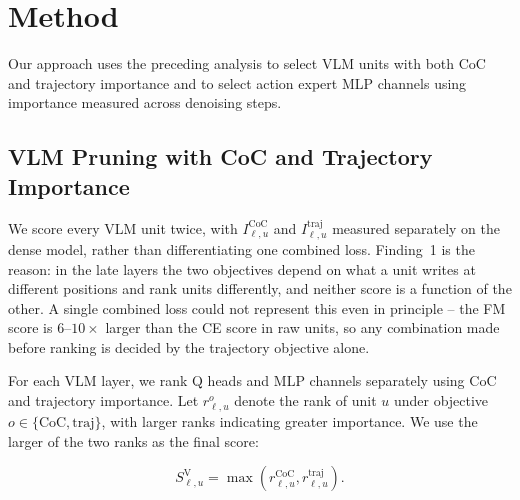 \section{Method}
\label{sec:structured_pruning}


Our approach uses the preceding analysis to select VLM units with both CoC and trajectory importance and to select action expert MLP channels using importance measured across denoising steps.

\subsection{VLM Pruning with CoC and Trajectory Importance}
\label{sec:vlm_pruning}

We score every VLM unit twice, with $I^{\mathrm{CoC}}_{\ell,u}$ and $I^{\mathrm{traj}}_{\ell,u}$ measured separately on the dense model, rather than differentiating one combined loss. Finding~1 is the reason: in the late layers the two objectives depend on what a unit writes at different positions and rank units differently, and neither score is a function of the other. A single combined loss could not represent this even in principle -- the FM score is $6$--$10\times$ larger than the CE score in raw units, so any combination made before ranking is decided by the trajectory objective alone.

For each VLM layer, we rank Q heads and MLP channels separately using CoC and trajectory importance. Let $r^o_{\ell,u}$ denote the rank of unit $u$ under objective $o\in\{\mathrm{CoC},\mathrm{traj}\}$, with larger ranks indicating greater importance. We use the larger of the two ranks as the final score:

\begin{equation}
    S^{\mathrm V}_{\ell,u}
      =\max\!\left(r^{\mathrm{CoC}}_{\ell,u},
                   r^{\mathrm{traj}}_{\ell,u}\right).
    \label{eq:vlm_combined_score}
\end{equation}

